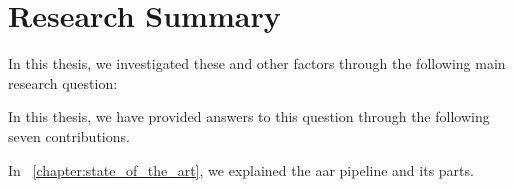 \section{Research Summary}

In this thesis, we investigated these and other factors through the following main research question:

\mainrq


In this thesis, we have provided answers to this question through the following seven contributions.






In \chaptername~\ref{chapter:state_of_the_art}, we explained the \gls{aar} pipeline and its parts.

	

\contribution[Datasets]
\label{con_con:datasets}
